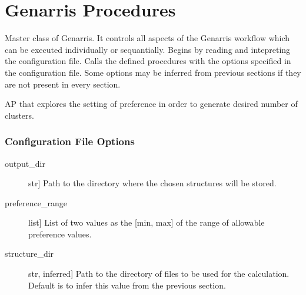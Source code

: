 \documentclass[letterpaper,10pt,english]{sphinxmanual}
\begin{document}
\section{Genarris Procedures}
\label{\detokenize{index:genarris-procedures}}

\begin{fulllineitems}
\label{\detokenize{index:Genarris.genarris_master.Genarris}}
Master class of Genarris. It controls all aspects of the
Genarris workflow which can be executed individually or sequantially.
Begins by reading and intepreting the configuration file.
Calls the defined procedures with the options specified in the
configuration file. Some options may be inferred from previous sections
if they are not present in every section.

\begin{fulllineitems}
\label{\detokenize{index:Genarris.genarris_master.Genarris.Affinity_Propagation_Fixed_Clusters}}
AP that explores the setting of preference in order to generate
desired number of clusters.
\subsubsection*{Configuration File Options}
\begin{description}
\item[{output\_dir}] \leavevmode{[}str{]}
Path to the directory where the chosen structures will be stored.

\item[{preference\_range}] \leavevmode{[}list{]}
List of two values as the {[}min, max{]} of the range of allowable
preference values.

\item[{structure\_dir}] \leavevmode{[}str, inferred{]}
Path to the directory of files to be used for the calculation.
Default is to infer this value from the previous section.


\end{description}
\end{fulllineitems}
\end{fulllineitems}
\end{document}
